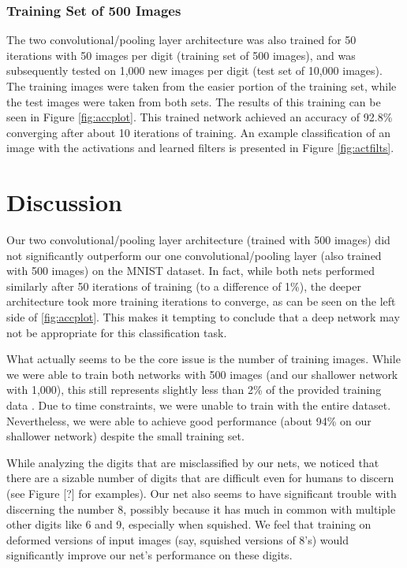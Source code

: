 \documentclass[10pt,twocolumn,letterpaper]{article}
\begin{document}
\subsubsection{Training Set of 500 Images}

The two convolutional/pooling layer architecture was also trained for 50 iterations with 50 images per digit
(training set of 500 images), and was subsequently tested on 1,000 new images per digit
(test set of 10,000 images).
The training images were taken from the easier portion of the training set,
while the test images were taken from both sets.
The results of this training can be seen in Figure \ref{fig:accplot}. This trained network achieved an accuracy of 92.8\% converging after about 10 iterations of training.
An example classification of an image with the activations and learned filters is presented
in Figure \ref{fig:actfilts}.

\section{Discussion}

Our two convolutional/pooling layer architecture (trained with 500 images) did not significantly outperform
our one convolutional/pooling layer (also trained with 500 images) on the MNIST dataset. In fact, while both nets
performed similarly after 50 iterations of training (to a difference of 1\%), the deeper architecture took more
training iterations to converge, as can be seen on the left side of \ref{fig:accplot}.
This makes it tempting to conclude that a deep network may not be appropriate for this classification task.

What actually seems to be the core issue is the number of training images. While we were able to train both
networks with 500 images (and our shallower network with 1,000), this still represents slightly less than 2\% of
the provided training data \cite{MNIST}. Due to time constraints, we were unable to train with the entire dataset.
Nevertheless, we were able to achieve good performance (about 94\% on our shallower network) despite the small
training set.

While analyzing the digits that are misclassified by our nets, we noticed that there are a sizable number of
digits that are difficult even for humans to discern (see Figure [?] for examples). Our net also seems to have
significant trouble with discerning the number 8, possibly because it has much in common with multiple other
digits like 6 and 9, especially when squished. We feel that training on deformed versions of input images
(say, squished versions of 8's) would significantly improve our net's performance on these digits.
\end{document}
